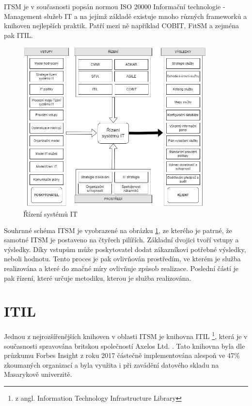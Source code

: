 \documentclass[
  digital,     %
  twoside,     %
  lof,         %
  lot,         %
]{fithesis4}
\begin{document}
ITSM je v současnosti popsán normou ISO 20000 Informační technologie - Management služeb IT a na jejímž základě existuje mnoho různých frameworků a knihoven nejlepších praktik. Patří mezi ně například COBIT, FitSM a zejména pak ITIL.\parencite[s.~25]{Matula2017}

\begin{figure}[h]
  \begin{center}
          \includegraphics[width=10cm]{img/itsm-diag.drawio.png}
  \end{center}
  \caption{Řízení systémů IT \parencite[s.~21]{Matula2017}}
  \label{fig:itsmDiag}
\end{figure} 

Souhrnné schéma ITSM je vyobrazené na obrázku \ref{fig:itsmDiag}, ze kterého je patrné, že samotné ITSM je postaveno na čtyřech pilířích. Základní dvojici tvoří vstupy a výsledky. Díky vstupům může poskytovatel dodat zákazníkovi potřebné výsledky, neboli hodnotu. Tento proces je pak ovlivňován prostředím, ve kterém je služba realizována a které do značné míry ovlivňuje způsob realizace. Poslední částí je pak řízení, které určuje metodiku, kterou je služba realizována. 


\section{ITIL}
Jednou z nejrozšířenějších knihoven v oblasti ITSM je knihovna ITIL \footnote{z angl. Information Technology Infrastructure Library}, která je v současnosti spravována britskou společností Axelos Ltd. \parencite[s.~31]{Matula2017}. Tato knihovna byla dle průzkumu Forbes Insight z roku 2017 částečně implementována alespoň ve 47\% zkoumaných organizací\parencite{Watts3082017} a byla využita i při  zavádění datového skladu na Masarykově univerzitě. 
\end{document}
